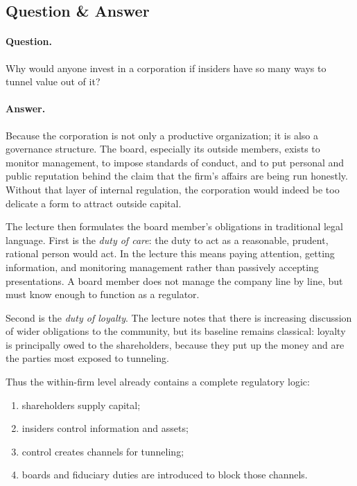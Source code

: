 \subsection{Question \& Answer}

\paragraph{Question.} Why would anyone invest in a corporation if insiders have so many ways to tunnel value out of it?

\paragraph{Answer.} Because the corporation is not only a productive organization; it is also a governance structure. The board, especially its outside members, exists to monitor management, to impose standards of conduct, and to put personal and public reputation behind the claim that the firm's affairs are being run honestly. Without that layer of internal regulation, the corporation would indeed be too delicate a form to attract outside capital.

The lecture then formulates the board member's obligations in traditional legal language. First is the \emph{duty of care}: the duty to act as a reasonable, prudent, rational person would act. In the lecture this means paying attention, getting information, and monitoring management rather than passively accepting presentations. A board member does not manage the company line by line, but must know enough to function as a regulator.

Second is the \emph{duty of loyalty}. The lecture notes that there is increasing discussion of wider obligations to the community, but its baseline remains classical: loyalty is principally owed to the shareholders, because they put up the money and are the parties most exposed to tunneling.

Thus the within-firm level already contains a complete regulatory logic:
\begin{enumerate}
\item shareholders supply capital;
\item insiders control information and assets;
\item control creates channels for tunneling;
\item boards and fiduciary duties are introduced to block those channels.
\end{enumerate}

